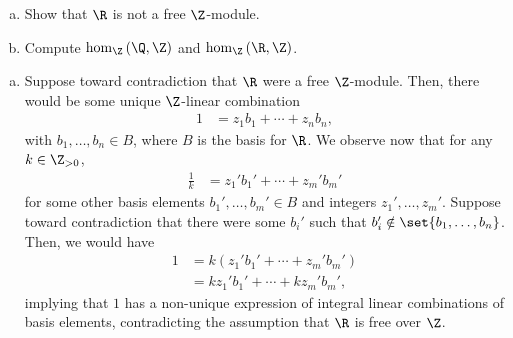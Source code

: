 \documentclass[10pt]{mypackage}
\begin{document}
\RaggedRight
\begin{problem}[Problem 1]\hfill
  \begin{enumerate}[(a)]
    \item Show that $\R$ is not a free $\Z$-module.
    \item Compute $\hom_{\Z}\left( \Q,\Z \right)$ and $\hom_{\Z}\left( \R,\Z \right)$.
  \end{enumerate}
\end{problem}
\begin{solution}\hfill
  \begin{enumerate}[(a)]
    \item Suppose toward contradiction that $\R$ were a free $\Z$-module. Then, there would be some unique $\Z$-linear combination
      \begin{align*}
        1 &= z_1b_1 + \cdots + z_nb_n,
      \end{align*}
      with $b_1,\dots,b_n\in B$, where $B$ is the basis for $\R$. We observe now that for any $k\in \Z_{ > 0 }$,
      \begin{align*}
        \frac{1}{k} &= z_1'b_1' + \cdots + z_m'b_m'
      \end{align*}
      for some other basis elements $b_1',\dots,b_m'\in B$ and integers $z_1',\dots,z_m'$. Suppose toward contradiction that there were some $b_i'$ such that $b_i'\notin \set{b_1,\dots,b_n}$. Then, we would have
      \begin{align*}
        1 &= k\left( z_1'b_1' + \cdots + z_m'b_m' \right)\\
          &= kz_1'b_1' + \cdots + kz_m'b_m',
      \end{align*}
      implying that $1$ has a non-unique expression of integral linear combinations of basis elements, contradicting the assumption that $\R$ is free over $\Z$.\newline


\end{enumerate}
\end{solution}
\end{document}
